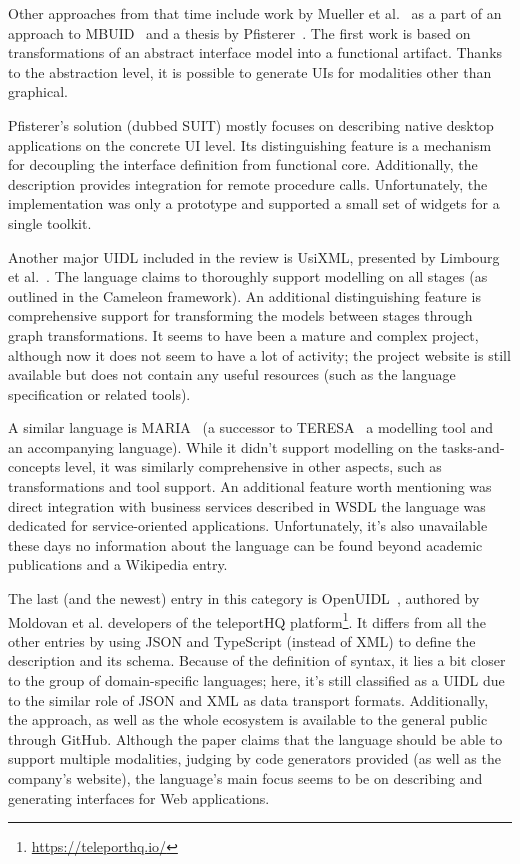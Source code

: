 Other approaches from that time include work by Mueller et al.~\cite{Mueller2001-un} as a part of an approach to MBUID~\cite{elwert1995Modelling} and a thesis by Pfisterer~\cite{pfistererSemantic2002}.
The first work is based on transformations of an abstract interface model into a functional artifact.
Thanks to the abstraction level, it is possible to generate UIs for modalities other than graphical.

Pfisterer's solution (dubbed SUIT) mostly focuses on describing native desktop applications on the concrete UI level.
Its distinguishing feature is a mechanism for decoupling the interface definition from functional core.
Additionally, the description provides integration for remote procedure calls.
Unfortunately, the implementation was only a prototype and supported a small set of widgets for a single toolkit.

Another major UIDL included in the review is UsiXML, presented by Limbourg et al.~\cite{limbourg2004usixml,limbourgusixml}.
The language claims to thoroughly support modelling on all stages (as outlined in the Cameleon framework).
An additional distinguishing feature is comprehensive support for transforming the models between stages through graph transformations.
It seems to have been a mature and complex project, although now it does not seem to have a lot of activity;
the project website is still available but does not contain any useful resources (such as the language specification or related tools).

A similar language is MARIA~\cite{Paterno2009-nj} (a successor to TERESA~\cite{Mori2004-sr}\,\textemdash\,a modelling tool and an accompanying language).
While it didn't support modelling on the tasks-and-concepts level, it was similarly comprehensive in other aspects, such as transformations and tool support.
An additional feature worth mentioning was direct integration with business services described in WSDL\,\textemdash\,the language was dedicated for service-oriented applications.
Unfortunately, it's also unavailable these days\,\textemdash\,no information about the language can be found beyond academic publications and a Wikipedia entry.

The last (and the newest) entry in this category is OpenUIDL~\cite{moldovan2020open}, authored by Moldovan et al.\,\textemdash\,developers of the teleportHQ platform\footnote{\url{https://teleporthq.io/}}.
It differs from all the other entries by using JSON and TypeScript (instead of XML) to define the description and its schema.
Because of the definition of syntax, it lies a bit closer to the group of domain-specific languages;
here, it's still classified as a UIDL due to the similar role of JSON and XML as data transport formats.
Additionally, the approach, as well as the whole ecosystem is available to the general public through GitHub.
Although the paper claims that the language should be able to support multiple modalities, judging by code generators provided (as well as the company's website), the language's main focus seems to be on describing and generating interfaces for Web applications.

